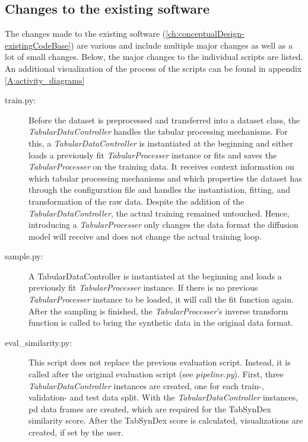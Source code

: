 \subsection{Changes to the existing software}
\label{ch:methods-changes}
The changes made to the existing software (\autoref{ch:conceptualDesign-existingCodeBase}) are various and include multiple major changes as well as a lot of small changes.
Below, the major changes to the individual scripts are listed.
An additional visualization of the process of the scripts can be found in appendix \ref{A:activity_diagrams}

\begin{description}
	\item[train.py:]
		Before the dataset is preprocessed and transferred into a dataset class, the \textit{TabularDataController} handles the tabular processing mechanisms.
		For this, a \textit{TabularDataController} is instantiated at the beginning and either loads a previously fit \textit{TabularProcesser} instance or fits and saves the \textit{TabularProcesser} on the training data.
		It receives context information on which tabular processing mechanisms and which properties the dataset has through the configuration file and handles the
		instantiation, fitting, and transformation of the raw data.
		Despite the addition of the \textit{TabularDataController}, the actual training remained untouched.
		Hence, introducing a \textit{TabularProcesser} only changes the data format the diffusion model will receive and does not change the actual training loop.

	\item[sample.py:]
		A TabularDataController is instantiated at the beginning and loads a previously fit \textit{TabularProcesser} instance.
		If there is no previous \textit{TabularProcesser} instance to be loaded, it will call the fit function again.
		After the sampling is finished, the \textit{TabularProcesser}'s inverse transform function is called to bring the synthetic data in the original data format.

	\item[eval\_similarity.py:]
		This script does not replace the previous evaluation script.
		Instead, it is called after the original evaluation script (see \textit{pipeline.py}).
		First, three \textit{TabularDataController} instances are created, one for each train-, validation- and test data split.
		With the \textit{TabularDataController} instances, \gls{pd} \cite{mckinney-proc-scipy-2010} data frames are created, which are required for the TabSynDex similarity score.
		After the TabSynDex score is calculated, visualizations are created, if set by the user.


\end{description}
